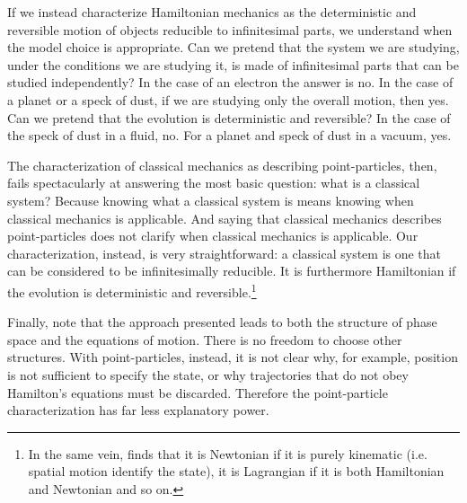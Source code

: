 \documentclass[11pt]{article}
\begin{document}
If we instead characterize Hamiltonian mechanics as the deterministic and reversible motion of objects reducible to infinitesimal parts, we understand when the model choice is appropriate. Can we pretend that the system we are studying, under the conditions we are studying it, is made of infinitesimal parts that can be studied independently? In the case of an electron the answer is no. In the case of a planet or a speck of dust, if we are studying only the overall motion, then yes. Can we pretend that the evolution is deterministic and reversible? In the case of the speck of dust in a fluid, no. For a planet and speck of dust in a vacuum, yes.

The characterization of classical mechanics as describing point-particles, then, fails spectacularly at answering the most basic question: what is a classical system? Because knowing what a classical system is means knowing when classical mechanics is applicable. And saying that classical mechanics describes point-particles does not clarify when classical mechanics is applicable. Our characterization, instead, is very straightforward: a classical system is one that can be considered to be infinitesimally reducible. It is furthermore Hamiltonian if the evolution is deterministic and reversible.\footnote{In the same vein, \cite{AoPPhy1} finds that it is Newtonian if it is purely kinematic (i.e. spatial motion identify the state), it is Lagrangian if it is both Hamiltonian and Newtonian and so on.}

Finally, note that the approach presented leads to both the structure of phase space and the equations of motion. There is no freedom to choose other structures. With point-particles, instead, it is not clear why, for example, position is not sufficient to specify the state, or why trajectories that do not obey Hamilton's equations must be discarded. Therefore the point-particle characterization has far less explanatory power.





{}
\end{document}
